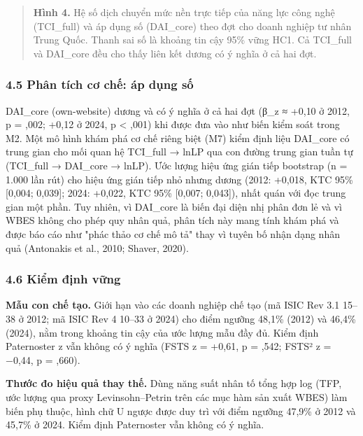 \documentclass[12pt,a4paper]{article}
\begin{document}
\begin{quote}
\textbf{Hình 4.} Hệ số dịch chuyển mức nền trực tiếp của năng lực công
nghệ (TCI\_full) và áp dụng số (DAI\_core) theo đợt cho doanh nghiệp tư
nhân Trung Quốc. Thanh sai số là khoảng tin cậy 95\% vững HC1. Cả
TCI\_full và DAI\_core đều cho thấy liên kết dương có ý nghĩa ở cả hai
đợt.
\end{quote}

\hypertarget{45-phuxe2n-tuxedch-cux1a1-chux1ebf-uxe1p-dux1ee5ng-sux1ed1}{%
\subsubsection{4.5 Phân tích cơ chế: áp dụng
số}\label{45-phuxe2n-tuxedch-cux1a1-chux1ebf-uxe1p-dux1ee5ng-sux1ed1}}

DAI\_core (own-website) dương và có ý nghĩa ở cả hai đợt (β\_z ≈ +0,10 ở
2012, p = ,002; +0,12 ở 2024, p \textless{} ,001) khi được đưa vào như
biến kiểm soát trong M2. Một mô hình khám phá cơ chế riêng biệt (M7)
kiểm định liệu DAI\_core có trung gian cho mối quan hệ TCI\_full → lnLP
qua con đường trung gian tuần tự (TCI\_full → DAI\_core → lnLP). Ước
lượng hiệu ứng gián tiếp bootstrap (n = 1.000 lần rút) cho hiệu ứng gián
tiếp nhỏ nhưng dương (2012: +0,018, KTC 95\% {[}0,004; 0,039{]}; 2024:
+0,022, KTC 95\% {[}0,007; 0,043{]}), nhất quán với đọc trung gian một
phần. Tuy nhiên, vì DAI\_core là biến đại diện nhị phân đơn lẻ và vì
WBES không cho phép quy nhân quả, phân tích này mang tính khám phá và
được báo cáo như "phác thảo cơ chế mô tả" thay vì tuyên bố nhận dạng
nhân quả (Antonakis et al., 2010; Shaver, 2020).

\hypertarget{46-kiux1ec3m-ux111ux1ecbnh-vux1eefng}{%
\subsubsection{4.6 Kiểm định
vững}\label{46-kiux1ec3m-ux111ux1ecbnh-vux1eefng}}

\textbf{Mẫu con chế tạo.} Giới hạn vào các doanh nghiệp chế tạo (mã ISIC
Rev 3.1 15--38 ở 2012; mã ISIC Rev 4 10--33 ở 2024) cho điểm ngưỡng
48,1\% (2012) và 46,4\% (2024), nằm trong khoảng tin cậy của ước lượng
mẫu đầy đủ. Kiểm định Paternoster z vẫn không có ý nghĩa (FSTS z =
+0,61, p = ,542; FSTS² z = −0,44, p = ,660).

\textbf{Thước đo hiệu quả thay thế.} Dùng năng suất nhân tố tổng hợp log
(TFP, ước lượng qua proxy Levinsohn--Petrin trên các mục hàm sản xuất
WBES) làm biến phụ thuộc, hình chữ U ngược được duy trì với điểm ngưỡng
47,9\% ở 2012 và 45,7\% ở 2024. Kiểm định Paternoster vẫn không có ý
nghĩa.
\end{document}
